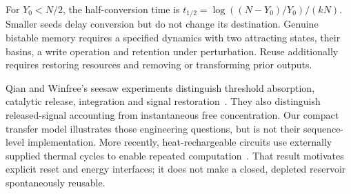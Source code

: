 
For $Y_0<N/2$, the half-conversion time is
$t_{1/2}=\log((N-Y_0)/Y_0)/(kN)$. Smaller seeds delay conversion but do not
change its destination. Genuine bistable memory requires a specified dynamics
with two attracting states, their basins, a write operation and retention
under perturbation. Reuse additionally requires restoring resources and
removing or transforming prior outputs.

Qian and Winfree's seesaw experiments distinguish threshold absorption,
catalytic release, integration and signal restoration~\cite{qian}.
They also distinguish released-signal accounting from instantaneous free
concentration. Our compact transfer model illustrates those engineering
questions, but is not their sequence-level implementation.
More recently, heat-rechargeable circuits use externally supplied thermal
cycles to enable repeated computation~\cite{heat}. That result motivates
explicit reset and energy interfaces; it does not make a closed, depleted
reservoir spontaneously reusable.


